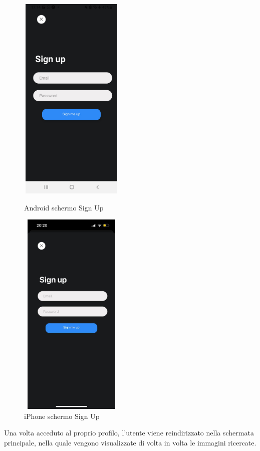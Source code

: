 \begin{figure}[H]
\begin{minipage}[h]{0.47\textwidth}
        \centering
        \includegraphics[width=5cm, height=10cm]{images/immaginiAndroid/signUp.jpg}
        \caption{\label{signUnAndroid} Android schermo Sign Up}
    \end{minipage}
    \hfill
    \begin{minipage}[h]{0.47\textwidth}
        \centering
        \includegraphics[width=5cm, height=10cm]{images/immaginiPhone/signUp.jpeg}
        \caption{\label{signUniPhone}iPhone schermo Sign Up}
    \end{minipage}
\end{figure}
Una volta acceduto al proprio profilo, l'utente viene reindirizzato nella schermata principale, nella quale vengono visualizzate di volta in volta le immagini ricercate.
